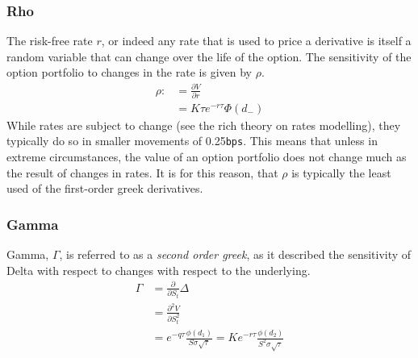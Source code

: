 \documentclass{article}
\def\code#1{\texttt{#1}}
\begin{document}
\subsubsection{Rho}
The risk-free rate $r$, or indeed any rate that is used to price a derivative is itself a random variable that can change over the life of the option. The sensitivity of the option portfolio to changes in the rate is given by $\rho$. 
\begin{align*}
    \rho :&= \frac{\partial V}{\partial r} \\
    &= K\tau e^{-r\tau}\Phi(d_-)
\end{align*}
While rates are subject to change (see the rich theory on rates modelling), they typically do so in smaller movements of 0.25\code{bps}. This means that unless in extreme circumstances, the value of an option portfolio does not change much as the result of changes in rates. It is for this reason, that $\rho$ is typically the least used of the first-order greek derivatives.

\subsubsection{Gamma}
Gamma, $\Gamma$, is referred to as a \textit{second order greek}, as it described the sensitivity of Delta with respect to changes with respect to the underlying.
\begin{align*}
    \Gamma &= \frac{\partial}{\partial S_t}\Delta \\
           &= \frac{\partial^2 V}{\partial S_t^2} \\
           &= e^{-q \tau} \frac{\phi\left(d_{1}\right)}{S \sigma \sqrt{\tau}}=K e^{-r \tau} \frac{\phi\left(d_{2}\right)}{S^{2} \sigma \sqrt{\tau}}
\end{align*}
\end{document}
